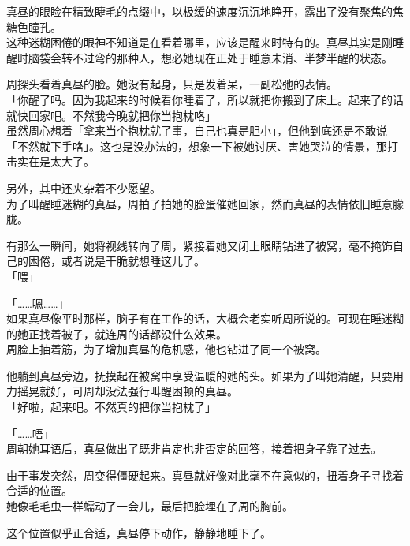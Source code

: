真昼的眼睑在精致睫毛的点缀中，以极缓的速度沉沉地睁开，露出了没有聚焦的焦糖色瞳孔。\\

这种迷糊困倦的眼神不知道是在看着哪里，应该是醒来时特有的。真昼其实是刚睡醒时脑袋会转不过弯的那种人，想必她现在正处于睡意未消、半梦半醒的状态。

周探头看着真昼的脸。她没有起身，只是发着呆，一副松弛的表情。\\

「你醒了吗。因为我起来的时候看你睡着了，所以就把你搬到了床上。起来了的话就快回家吧。不然我今晚就把你当抱枕咯」\\

虽然周心想着「拿来当个抱枕就了事，自己也真是胆小」，但他到底还是不敢说「不然就下手咯」。这也是没办法的，想象一下被她讨厌、害她哭泣的情景，那打击实在是太大了。

另外，其中还夹杂着不少愿望。\\

为了叫醒睡迷糊的真昼，周拍了拍她的脸蛋催她回家，然而真昼的表情依旧睡意朦胧。

有那么一瞬间，她将视线转向了周，紧接着她又闭上眼睛钻进了被窝，毫不掩饰自己的困倦，或者说是干脆就想睡这儿了。\\

「喂」

「……嗯……」\\

如果真昼像平时那样，脑子有在工作的话，大概会老实听周所说的。可现在睡迷糊的她正找着被子，就连周的话都没什么效果。\\

周脸上抽着筋，为了增加真昼的危机感，他也钻进了同一个被窝。

他躺到真昼旁边，抚摸起在被窝中享受温暖的她的头。如果为了叫她清醒，只要用力摇晃就好，可周却没法强行叫醒困顿的真昼。\\

「好啦，起来吧。不然真的把你当抱枕了」

「……唔」\\

周朝她耳语后，真昼做出了既非肯定也非否定的回答，接着把身子靠了过去。

由于事发突然，周变得僵硬起来。真昼就好像对此毫不在意似的，扭着身子寻找着合适的位置。\\

她像毛毛虫一样蠕动了一会儿，最后把脸埋在了周的胸前。

这个位置似乎正合适，真昼停下动作，静静地睡下了。\\

